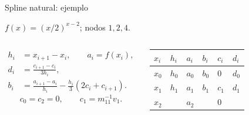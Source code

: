\documentclass[main.tex]{subfiles}
\begin{document}
\begin{frame}[t]{Spline natural: ejemplo}
\par\noindent\begin{minipage}[t][9mm][t]{\textwidth}\small\strut $f(x)=(x/2)^{x-2}$; nodos $1,2,4$.\end{minipage}\par\nointerlineskip
\begin{columns}[T]\scriptsize\begin{align*}
h_i&=x_{i+1}-x_i,\qquad a_i=f(x_i),\\
d_i&=\frac{c_{i+1}-c_i}{3h_i},\\
b_i&=\frac{a_{i+1}-a_i}{h_i}-\frac{h_i}{3}(2c_i+c_{i+1}).
\end{align*}\scriptsize\[c_0=c_2=0,\qquad c_1=m_{11}^{-1}v_1.\]\begin{minipage}[t]{\textwidth}\begingroup\scriptsize\setlength{\tabcolsep}{2pt}\begin{center}\begin{tabular}{|C{.12\textwidth}|C{.12\textwidth}|C{.12\textwidth}|C{.12\textwidth}|C{.12\textwidth}|C{.12\textwidth}|}\hline
\rule[-2mm]{0pt}{6mm}$x_i$&$h_i$&$a_i$&$b_i$&$c_i$&$d_i$\\\hline
\rule[-2.5mm]{0pt}{7mm}$x_0$&$h_0$&$a_0$&$b_0$&$0$&$d_0$\\\hline
\rule[-2.5mm]{0pt}{7mm}$x_1$&$h_1$&$a_1$&$b_1$&$c_1$&$d_1$\\\hline
\rule[-2.5mm]{0pt}{7mm}$x_2$&&$a_2$&&$0$&\\\hline
\end{tabular}\end{center}\endgroup\end{minipage}\par
\end{columns}
\end{frame}
\end{document}

